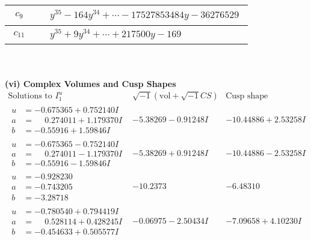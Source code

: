 \documentclass[1p]{elsarticle_modified}
\theoremstyle{definition}
\newcommand{\I}{\sqrt{-1}}
\begin{document}
\begin{tabular}{m{50pt}|m{274pt}}
\hline $$\begin{aligned}c_{9}\end{aligned}$$&$\begin{aligned}
&y^{35}-164 y^{34}+\cdots-17527853484 y-36276529
\end{aligned}$\\
\hline $$\begin{aligned}c_{11}\end{aligned}$$&$\begin{aligned}
&y^{35}+9 y^{34}+\cdots+217500 y-169
\end{aligned}$\\
\hline
\end{tabular}\\~\\
\newpage\flushleft \textbf{(vi) Complex Volumes and Cusp Shapes}
$$\begin{array}{c|c|c}  
\text{Solutions to }I^u_{1}& \I (\text{vol} + \sqrt{-1}CS) & \text{Cusp shape}\\
 \hline 
\begin{aligned}
u &= -0.675365 + 0.752140 I \\
a &= \phantom{-}0.274011 + 1.179370 I \\
b &= -0.55916 + 1.59846 I\end{aligned}
 & -5.38269 - 0.91248 I & -10.44886 + 2.53258 I \\ \hline\begin{aligned}
u &= -0.675365 - 0.752140 I \\
a &= \phantom{-}0.274011 - 1.179370 I \\
b &= -0.55916 - 1.59846 I\end{aligned}
 & -5.38269 + 0.91248 I & -10.44886 - 2.53258 I \\ \hline\begin{aligned}
u &= -0.928230\phantom{ +0.000000I} \\
a &= -0.743205\phantom{ +0.000000I} \\
b &= -3.28718\phantom{ +0.000000I}\end{aligned}
 & -10.2373\phantom{ +0.000000I} & -6.48310\phantom{ +0.000000I} \\ \hline\begin{aligned}
u &= -0.780540 + 0.794419 I \\
a &= \phantom{-}0.528114 + 0.428245 I \\
b &= -0.454633 + 0.505577 I\end{aligned}
 & -0.06975 - 2.50434 I & -7.09658 + 4.10230 I \\ \hline\begin{aligned}

\end{aligned}
\end{array}$$
\end{document}
